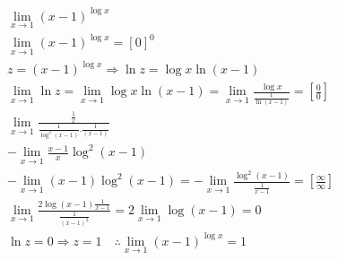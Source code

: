 \begin{ex}
\begin{align}
&\lim_{x\rightarrow 1} (x-1)^{\log{x}}\nonumber\\
&\lim_{x\rightarrow 1} (x-1)^{\log{x}}=[0]^0\nonumber\\
&z=(x-1)^{\log{x}} \Rightarrow \ln{z}=\log{x}\ln{(x-1)}\nonumber\\
&\lim_{x\rightarrow 1} \ln{z} = \lim_{x\rightarrow 1} \log{x}\ln{(x-1)}=\lim_{x\rightarrow 1} \frac{\log{x}}{\frac{1}{\ln{(x-1)}}}=\left[\frac{0}{0}\right]\nonumber\\
&\lim_{x\rightarrow 1} \frac{\frac{1}{x}}{\frac{1}{\log^2{(x-1)}}.\frac{1}{(x-1)}}\nonumber\\
&-\lim_{x\rightarrow 1}\frac{x-1}{x}\log^2{(x-1)}\nonumber\\
&-\lim_{x\rightarrow 1} (x-1)\log^2{(x-1)}=-\lim_{x\rightarrow 1} \frac{\log^2{(x-1)}}{\frac{1}{x-1}}=\left[\frac{\infty}{\infty}\right]\nonumber\\
&\lim_{x\rightarrow 1} \frac{2\log{(x-1)}\frac{1}{x-1}}{\frac{1}{(x-1)^2}}=2\lim_{x\rightarrow 1} \log{(x-1)}=0\nonumber\\
&\ln{z}=0 \Rightarrow z=1 \quad \therefore \lim_{x\rightarrow 1} (x-1)^{\log{x}}=1\nonumber
\end{align}
\end{ex} 